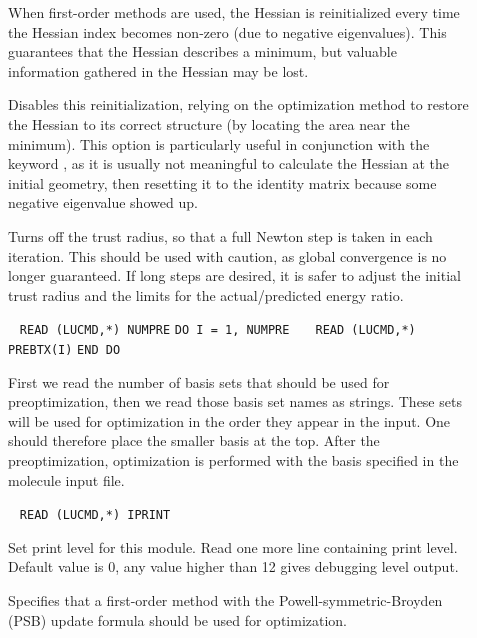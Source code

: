 \begin{description}
\item[]
When first-order methods are used, the Hessian is reinitialized every
time the Hessian index becomes non-zero (due to negative
eigenvalues). This guarantees that the Hessian describes a minimum,
but valuable information gathered in the Hessian may be
lost.

Disables this reinitialization, relying on the
optimization method to restore the Hessian to its correct structure
(by locating the area near the minimum). This option is particularly
useful in conjunction with the keyword , as it is usually
not meaningful to calculate the Hessian at the initial geometry, then
resetting it to the identity matrix because some negative eigenvalue
showed up.

\item[]
Turns off the trust radius, so that a full Newton step
is taken in each iteration. This should be used with caution, as
global convergence is no longer guaranteed. If long steps are desired,
it is safer to adjust the initial trust radius and the limits for the
actual/predicted energy ratio.

\item[]\verb| |\newline
\verb|READ (LUCMD,*) NUMPRE|\newline
\verb|DO I = 1, NUMPRE|\newline
\verb|   READ (LUCMD,*) PREBTX(I)|\newline
\verb|END DO|

First we read the number of basis sets that should be
used for preoptimization, then we read those
basis set names as strings. These
sets will be used for optimization in the order they appear in the
input. One should therefore place the smaller basis at the
top. After the preoptimization, optimization is performed with the
basis specified in the molecule input file.

\item[]\verb| |
\newline
\verb|READ (LUCMD,*) IPRINT|

Set print level for this module.  Read one more line containing print
level. Default value is 0, any value higher than 12 gives debugging
level output.

\item[]
Specifies that a first-order method with the
Powell-symmetric-Broyden (PSB) update formula should be used
for optimization.


\end{description}
